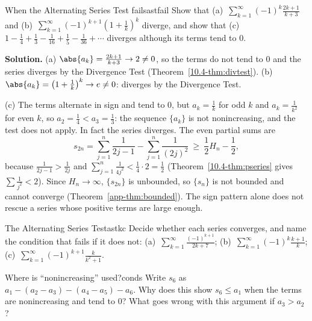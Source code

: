 \documentclass[11pt]{article}
\begin{document}
\begin{exmp}{When the Alternating Series Test fails}{astfail}
Show that (a)~$\displaystyle\sum_{k=1}^\infty(-1)^k\frac{2k+1}{k+3}$ and (b)~$\displaystyle\sum_{k=1}^\infty(-1)^{k+1}\left(1+\frac1k\right)^k$ diverge, and show that (c)~$1-\frac14+\frac13-\frac1{16}+\frac15-\frac1{36}+\cdots$ diverges although its terms tend to $0$.

\textbf{Solution.} (a) $\abs{a_k}=\frac{2k+1}{k+3}\to2\ne0$, so the terms do not tend to $0$ and the series diverges by the Divergence Test (Theorem~\ref{10.4-thm:divtest}). (b) $\abs{a_k}=\left(1+\frac1k\right)^k\to e\ne0$: diverges by the Divergence Test.

(c) The terms alternate in sign and tend to $0$, but $a_k=\frac1k$ for odd $k$ and $a_k=\frac1{k^2}$ for even $k$, so $a_2=\frac14<a_3=\frac13$: the sequence $\{a_k\}$ is not nonincreasing, and the test does not apply. In fact the series diverges. The even partial sums are
\[
s_{2n}=\sum_{j=1}^n\frac1{2j-1}-\sum_{j=1}^n\frac1{(2j)^2}\ \ge\ \frac12H_n-\frac12 ,
\]
because $\frac1{2j-1}>\frac1{2j}$ and $\sum_{j=1}^n\frac1{4j^2}<\frac14\cdot2=\frac12$ (Theorem~\ref{10.4-thm:pseries} gives $\sum\frac1{j^2}<2$). Since $H_n\to\infty$, $\{s_{2n}\}$ is unbounded, so $\{s_n\}$ is not bounded and cannot converge (Theorem~\ref{app-thm:bounded}). The sign pattern alone does not rescue a series whose positive terms are large enough.
\end{exmp}

\begin{kc}{The Alternating Series Test}{astkc}
Decide whether each series converges, and name the condition that fails if it does not: (a)~$\displaystyle\sum_{k=1}^\infty\frac{(-1)^{k+1}}{2k+7}$; \quad (b)~$\displaystyle\sum_{k=1}^\infty(-1)^k\frac{k+1}k$; \quad (c)~$\displaystyle\sum_{k=1}^\infty(-1)^{k+1}\frac k{k^2+1}$.
\end{kc}

\begin{think}{Where is ``nonincreasing'' used?}{conds}
Write $s_6$ as $a_1-(a_2-a_3)-(a_4-a_5)-a_6$. Why does this show $s_6\le a_1$ when the terms are nonincreasing and tend to $0$? What goes wrong with this argument if $a_3>a_2$?
\end{think}
\end{document}
